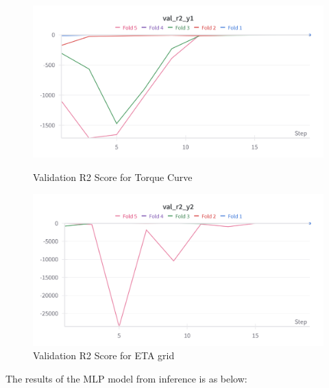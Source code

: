 \documentclass{report} %
\begin{document}
\begin{figure}[h]
    \centering
    \begin{minipage}[b]{0.3\textwidth}
        \includegraphics[width=\textwidth]{./ReportImages/val_r2_y1.png}
        \caption{Validation R2 Score for Torque Curve}
        \label{fig:Validation R2 Score for Torque Curve}
    \end{minipage}
    \hfill
    \begin{minipage}[b]{0.3\textwidth}
        \includegraphics[width=\textwidth]{./ReportImages/val_r2_y2.png}
        \caption{Validation R2 Score for ETA grid}
        \label{fig:Validation R2 Score for ETA grid}
    \end{minipage}
\end{figure}

The results of the MLP model from inference is as below:
\end{document}
